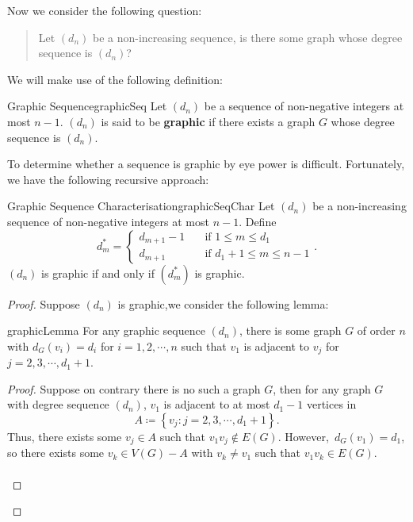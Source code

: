 \documentclass[math]{amznotes}
\theoremstyle{remark}
\begin{document}
Now we consider the following question:
\begin{quote}
    Let $(d_n)$ be a non-increasing sequence, is there some graph whose degree sequence is $(d_n)$?
\end{quote}
We will make use of the following definition:
\begin{dfnbox}{Graphic Sequence}{graphicSeq}
    Let $(d_n)$ be a sequence of non-negative integers at most $n - 1$. $(d_n)$ is said to be {\color{red} \textbf{graphic}} if there exists a graph $G$ whose degree sequence is $(d_n)$.
\end{dfnbox}
To determine whether a sequence is graphic by eye power is difficult. Fortunately, we have the following recursive approach:
\begin{thmbox}{Graphic Sequence Characterisation}{graphicSeqChar}
    Let $(d_n)$ be a non-increasing sequence of non-negative integers at most $n - 1$. Define
    \begin{equation*}
        d^*_m = \begin{cases}
            d_{m + 1} - 1 & \quad\textrm{if } 1 \leq m \leq d_1 \\
            d_{m + 1} & \quad\textrm{if } d_1 + 1 \leq m \leq n - 1
        \end{cases}.
    \end{equation*}
    $(d_n)$ is graphic if and only if $\left(d^*_m\right)$ is graphic.
    \tcblower
    \begin{proof}
        Suppose $(d_n)$ is graphic,we consider the following lemma:
        \begin{lembox}{}{graphicLemma}
            For any graphic sequence $(d_n)$, there is some graph $G$ of order $n$ with $d_G(v_i) = d_i$ for $i = 1, 2, \cdots, n$ such that $v_1$ is adjacent to $v_j$ for $j = 2, 3, \cdots, d_1 + 1$.
            \tcblower
            \begin{proof}
                Suppose on contrary there is no such a graph $G$, then for any graph $G$ with degree sequence $(d_n)$, $v_1$ is adjacent to at most $d_1 - 1$ vertices in
                \begin{equation*}
                    A \coloneqq \left\{v_j \colon j = 2, 3, \cdots, d_1 + 1\right\}.
                \end{equation*}
                Thus, there exists some $v_j \in A$ such that $v_1v_j \notin E(G)$. However,~$d_G(v_1) = d_1$, so there exists some $v_k \in V(G) - A$ with $v_k \neq v_1$ such that $v_1v_k \in E(G)$.
                \\\\

\end{proof}
\end{lembox}
\end{proof}
\end{thmbox}
\end{document}
